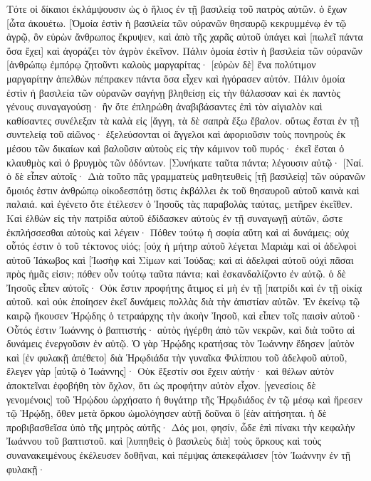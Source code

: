 Τότε οἱ δίκαιοι ἐκλάμψουσιν ὡς ὁ ἥλιος ἐν τῇ βασιλείᾳ τοῦ πατρὸς αὐτῶν. ὁ ἔχων [ὦτα ἀκουέτω. 
[Ὁμοία ἐστὶν ἡ βασιλεία τῶν οὐρανῶν θησαυρῷ κεκρυμμένῳ ἐν τῷ ἀγρῷ, ὃν εὑρὼν ἄνθρωπος ἔκρυψεν, καὶ ἀπὸ τῆς χαρᾶς αὐτοῦ ὑπάγει καὶ [πωλεῖ πάντα ὅσα ἔχει] καὶ ἀγοράζει τὸν ἀγρὸν ἐκεῖνον. 
Πάλιν ὁμοία ἐστὶν ἡ βασιλεία τῶν οὐρανῶν [ἀνθρώπῳ ἐμπόρῳ ζητοῦντι καλοὺς μαργαρίτας· 
[εὑρὼν δὲ] ἕνα πολύτιμον μαργαρίτην ἀπελθὼν πέπρακεν πάντα ὅσα εἶχεν καὶ ἠγόρασεν αὐτόν. 
Πάλιν ὁμοία ἐστὶν ἡ βασιλεία τῶν οὐρανῶν σαγήνῃ βληθείσῃ εἰς τὴν θάλασσαν καὶ ἐκ παντὸς γένους συναγαγούσῃ· 
ἣν ὅτε ἐπληρώθη ἀναβιβάσαντες ἐπὶ τὸν αἰγιαλὸν καὶ καθίσαντες συνέλεξαν τὰ καλὰ εἰς [ἄγγη, τὰ δὲ σαπρὰ ἔξω ἔβαλον. 
οὕτως ἔσται ἐν τῇ συντελείᾳ τοῦ αἰῶνος· ἐξελεύσονται οἱ ἄγγελοι καὶ ἀφοριοῦσιν τοὺς πονηροὺς ἐκ μέσου τῶν δικαίων 
καὶ βαλοῦσιν αὐτοὺς εἰς τὴν κάμινον τοῦ πυρός· ἐκεῖ ἔσται ὁ κλαυθμὸς καὶ ὁ βρυγμὸς τῶν ὀδόντων. 
[Συνήκατε ταῦτα πάντα; λέγουσιν αὐτῷ· [Ναί. 
ὁ δὲ εἶπεν αὐτοῖς· Διὰ τοῦτο πᾶς γραμματεὺς μαθητευθεὶς [τῇ βασιλείᾳ] τῶν οὐρανῶν ὅμοιός ἐστιν ἀνθρώπῳ οἰκοδεσπότῃ ὅστις ἐκβάλλει ἐκ τοῦ θησαυροῦ αὐτοῦ καινὰ καὶ παλαιά. 
καὶ ἐγένετο ὅτε ἐτέλεσεν ὁ Ἰησοῦς τὰς παραβολὰς ταύτας, μετῆρεν ἐκεῖθεν. 
Καὶ ἐλθὼν εἰς τὴν πατρίδα αὐτοῦ ἐδίδασκεν αὐτοὺς ἐν τῇ συναγωγῇ αὐτῶν, ὥστε ἐκπλήσσεσθαι αὐτοὺς καὶ λέγειν· Πόθεν τούτῳ ἡ σοφία αὕτη καὶ αἱ δυνάμεις; 
οὐχ οὗτός ἐστιν ὁ τοῦ τέκτονος υἱός; [οὐχ ἡ μήτηρ αὐτοῦ λέγεται Μαριὰμ καὶ οἱ ἀδελφοὶ αὐτοῦ Ἰάκωβος καὶ [Ἰωσὴφ καὶ Σίμων καὶ Ἰούδας; 
καὶ αἱ ἀδελφαὶ αὐτοῦ οὐχὶ πᾶσαι πρὸς ἡμᾶς εἰσιν; πόθεν οὖν τούτῳ ταῦτα πάντα; 
καὶ ἐσκανδαλίζοντο ἐν αὐτῷ. ὁ δὲ Ἰησοῦς εἶπεν αὐτοῖς· Οὐκ ἔστιν προφήτης ἄτιμος εἰ μὴ ἐν τῇ [πατρίδι καὶ ἐν τῇ οἰκίᾳ αὐτοῦ. 
καὶ οὐκ ἐποίησεν ἐκεῖ δυνάμεις πολλὰς διὰ τὴν ἀπιστίαν αὐτῶν. 
Ἐν ἐκείνῳ τῷ καιρῷ ἤκουσεν Ἡρῴδης ὁ τετραάρχης τὴν ἀκοὴν Ἰησοῦ, 
καὶ εἶπεν τοῖς παισὶν αὐτοῦ· Οὗτός ἐστιν Ἰωάννης ὁ βαπτιστής· αὐτὸς ἠγέρθη ἀπὸ τῶν νεκρῶν, καὶ διὰ τοῦτο αἱ δυνάμεις ἐνεργοῦσιν ἐν αὐτῷ. 
Ὁ γὰρ Ἡρῴδης κρατήσας τὸν Ἰωάννην ἔδησεν [αὐτὸν καὶ [ἐν φυλακῇ ἀπέθετο] διὰ Ἡρῳδιάδα τὴν γυναῖκα Φιλίππου τοῦ ἀδελφοῦ αὐτοῦ, 
ἔλεγεν γὰρ [αὐτῷ ὁ Ἰωάννης]· Οὐκ ἔξεστίν σοι ἔχειν αὐτήν· 
καὶ θέλων αὐτὸν ἀποκτεῖναι ἐφοβήθη τὸν ὄχλον, ὅτι ὡς προφήτην αὐτὸν εἶχον. 
[γενεσίοις δὲ γενομένοις] τοῦ Ἡρῴδου ὠρχήσατο ἡ θυγάτηρ τῆς Ἡρῳδιάδος ἐν τῷ μέσῳ καὶ ἤρεσεν τῷ Ἡρῴδῃ, 
ὅθεν μετὰ ὅρκου ὡμολόγησεν αὐτῇ δοῦναι ὃ [ἐὰν αἰτήσηται. 
ἡ δὲ προβιβασθεῖσα ὑπὸ τῆς μητρὸς αὐτῆς· Δός μοι, φησίν, ὧδε ἐπὶ πίνακι τὴν κεφαλὴν Ἰωάννου τοῦ βαπτιστοῦ. 
καὶ [λυπηθεὶς ὁ βασιλεὺς διὰ] τοὺς ὅρκους καὶ τοὺς συνανακειμένους ἐκέλευσεν δοθῆναι, 
καὶ πέμψας ἀπεκεφάλισεν [τὸν Ἰωάννην ἐν τῇ φυλακῇ· 
